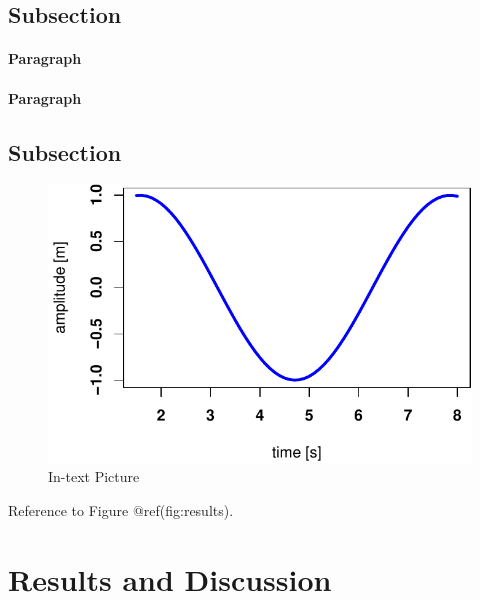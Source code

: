 \documentclass[fleqn,10pt,lineno]{wlpeerj} %
\begin{document}
\lipsum[5] 

\subsection*{Subsection}\label{subsection}

\lipsum[6] 

\paragraph{Paragraph}

\lipsum[7]  \paragraph{Paragraph} \lipsum[8] 

\subsection*{Subsection}\label{subsection-1}

\lipsum[9] 

\begin{figure}
\includegraphics[width=1\linewidth]{Untitled_files/figure-latex/results-1} \caption{In-text Picture}\label{fig:results}
\end{figure}

Reference to Figure @ref(fig:results).

\section*{Results and Discussion}\label{results-and-discussion}
\end{document}

